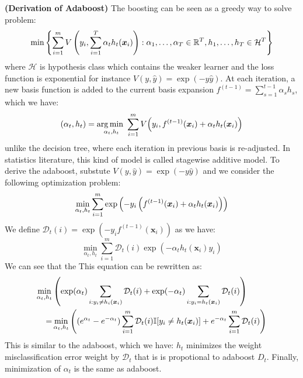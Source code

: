\begin{remark}{\textbf{(Derivation of Adaboost)}}
    The boosting can be seen as a greedy way to solve problem:
    \begin{equation*}
        \min\left\{ \sum^m_{i=1}V\left( y_i, \sum^T_{i=1}\alpha_th_t(\boldsymbol x_i) \right) : \alpha_1,\dots,\alpha_T\in \mathbb{R}^T, h_1,\dots,h_T \in \mathcal{H}^T \right\}
    \end{equation*} 
    where $\mathcal{H}$ is hypothesis class which contains the weaker learner and the loss function is exponential for instance $V(y, \hat{y}) = \exp(-y\hat{y})$. At each iteration, a new basis function is added to the current basis expansion $f^{(t-1)} = \sum^{t-1}_{s=1}\alpha_sh_s$, which we have:
    \begin{equation*}
        (\alpha_t, h_t) = \underset{\alpha_t, h_t}{\arg\min \ } \sum^m_{i=1}V\Big( y_i, f^{(t-1)}(\boldsymbol x_i) + \alpha_th_t(\boldsymbol x_i) \Big)
    \end{equation*}
    unlike the decision tree, where each iteration in previous basis is re-adjusted. In statistics literature, this kind of model is called stagewise additive model. To derive the adaboost, substute $V(y, \hat{y}) = \exp(-y\hat{y})$ and we consider the followimg optimization problem:
    \begin{equation*}
        \min_{\alpha_t,h_t}\sum^m_{i=1}\exp\left( -y_i\left( f^{(t-1)}(\boldsymbol x_i) + \alpha_th_t(\boldsymbol x_i) \right) \right)
    \end{equation*}
    We define $\mathcal{D}_t(i) = \exp(-y_if^{(t-1)}(\boldsymbol x_i))$ as we have:
    \begin{equation*}
        \min_{\alpha_t, h_t} \sum^m_{i=1}\mathcal{D}_t(i)\exp(-\alpha_th_t(\boldsymbol x_i)y_i)
    \end{equation*}
    We can see that the This equation can be rewritten as:
    \begin{equation*}
    \begin{aligned}
        \min_{\alpha_t, h_t}&\left( \exp(\alpha_t)\sum_{i : y_i \ne h_i(\boldsymbol x_i)} \mathcal{D}_t(i) + \exp(-\alpha_t)\sum_{i:y_i = h_t(\boldsymbol x_i)} \mathcal{D}_t(i)  \right) \\
        =&\min_{\alpha_t, h_t}\left(  (e^{\alpha_t} - e^{-\alpha_t})\sum^m_{i=1}\mathcal{D}_t(i)\mathbb{I}[y_i \ne h_t(\boldsymbol x_i)] + e^{-\alpha_t}\sum^m_{i=1}\mathcal{D}_t(i)  \right)
    \end{aligned}
    \end{equation*}
    This is similar to the adaboost, which we have: $h_t$ minimizes the weight misclassification error weight by $\mathcal{D}_t$ that is is propotional to adaboost $D_t$. Finally, minimization of $\alpha_t$ is the same as adaboost. 
\end{remark}

